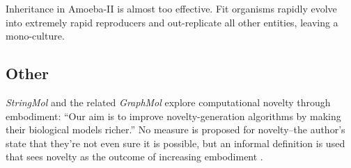 Inheritance in Amoeba-II is almost too effective. Fit organisms rapidly evolve into extremely rapid reproducers and out-replicate all other entities, leaving a mono-culture.

%
%
%
%
\subsection{Other}

\emph{StringMol} \parencite{Hickinbotham2011} and the related \emph{GraphMol} \parencite{Nellis2012, Nellis2014} explore computational novelty through embodiment: ``Our aim is to improve novelty-generation algorithms by making their biological models richer.'' No measure is proposed for novelty--the author's state that they're not even sure it is possible, but an informal definition is used that sees novelty as the outcome of increasing embodiment \parencite[p.87]{Nellis2012}. 

